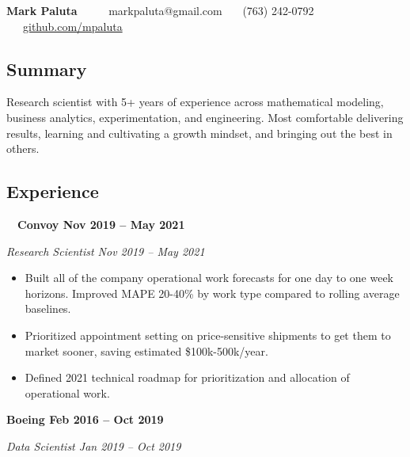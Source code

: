 \documentclass[10pt,letterpaper]{article}
\begin{document}
    \begin{center}
    {\LARGE \textbf{Mark Paluta}} \ \ \ \ \
    markpaluta@gmail.com \ \textbullet \ \ (763) 242-0792 \ \textbullet \ \ \href{https://github.com/mpaluta}{github.com/mpaluta}
    \end{center}

\subsection*{Summary}

    \begin{adjustwidth}{1.25em}{}
        Research scientist with 5+ years of experience across mathematical modeling, business analytics, experimentation, and engineering. Most comfortable delivering results, learning and cultivating a growth mindset, and bringing out the best in others.
    \end{adjustwidth}

\subsection*{Experience}

    \quad \ \ \textbf{Convoy \hfill Nov 2019 – May 2021}

        \quad \emph{Research Scientist \hfill Nov 2019 – May 2021}

            \begin{itemize}[label={--}, leftmargin=.5in, labelindent=16pt, topsep=1pt]
                \setlength\itemsep{-.25em}
            	\item Built all of the company operational work forecasts for one day to one week horizons. Improved MAPE 20-40\% by work type compared to rolling average baselines.
            	\item Prioritized appointment setting on price-sensitive shipments to get them to market sooner, saving estimated \$100k-500k/year.
            	\item Defined 2021 technical roadmap for prioritization and allocation of operational work.
            \end{itemize}

    \textbf{Boeing \hfill Feb 2016 – Oct 2019}

        \quad \emph{Data Scientist \hfill Jan 2019 – Oct 2019}
\end{document}
